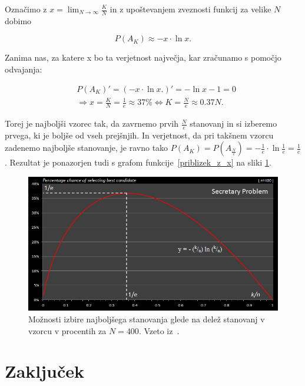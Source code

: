 \documentclass[a4paper, 12pt, titlepage]{article}
\begin{document}
Označimo z $x = \lim_{N \rightarrow \infty} \frac{K}{N}$ in z upoštevanjem zveznosti funkcij za velike $N$ dobimo

\begin{equation}\label{priblizek_z_x}
    P(A_{K}) \approx - x \cdot \ln x.
\end{equation}

Zanima nas, za katere x bo ta verjetnost največja, kar zračunamo s pomočjo odvajanja:

\begin{align*}
    & P(A_{K})' = (- x \cdot \ln x.)' = - \ln x - 1 = 0 \\ & \Longrightarrow x = \frac{K}{N} = \frac{1}{e} \approx 37\% \Longleftrightarrow K = \frac{N}{e} \approx 0.37 N.
\end{align*}

Torej je najboljši vzorec tak, da zavrnemo prvih $\frac{N}{e}$ stanovanj in si izberemo prvega, ki je boljše od vseh prejšnjih. In verjetnost, da pri takšnem vzorcu zadenemo najboljše stanovanje, je ravno tako $P(A_{K}) = P(A_{\frac{N}{e}}) = - \frac{1}{e} \cdot \ln \frac{1}{e} = \frac{1}{e}$. Rezultat je ponazorjen tudi s grafom funkcije~\ref{priblizek_z_x} na sliki \ref{graf_xlnx}.

\begin{figure}[h]
    \centering
    \includegraphics[scale=0.7]{slike/graf_xlnx.png}
    \caption{Možnosti izbire najboljšega stanovanja glede na delež stanovanj v vzorcu v procentih za $N = 400$. Vzeto iz~\cite{secretary_puzzle}.}
    \label{graf_xlnx}
\end{figure}

\newpage

\section{Zaključek}
\end{document}
